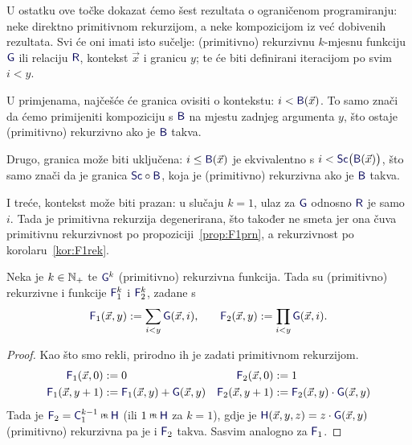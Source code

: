 \begin{napomena}[{name=[izračunljive granice i prazni konteksti]}]\label{nap:igpk}
	U ostatku ove točke dokazat ćemo šest rezultata o ograničenom programiranju: neke direktno primitivnom rekurzijom, a neke kompozicijom iz već dobivenih rezultata. Svi će oni imati isto sučelje: (primitivno) rekurzivnu $k$-mjesnu funkciju $\f G$ ili relaciju $\f R$, kontekst $\vec x$ i granicu $y$; te će biti definirani iteracijom po svim $i<y$.
	
	U primjenama, najčešće će granica ovisiti o kontekstu: $i<\f B(\vec x)$. To samo znači da ćemo primijeniti kompoziciju s $\f B$ na mjestu zadnjeg argumenta $y$, što ostaje (primitivno) rekurzivno ako je $\f B$ takva.

	Drugo, granica može biti uključena: $i\le\f B(\vec x)$ je ekvivalentno s $i<\f{Sc}\bigl(\f B(\vec x)\bigr)$, što samo znači da je granica $\f{Sc}\circ\f B$, koja je (primitivno) rekurzivna ako je $\f B$ takva.

	I treće, kontekst može biti prazan: u slučaju $k=1$, ulaz za $\f G$ odnosno $\f R$ je samo $i$. Tada je primitivna rekurzija degenerirana, što također ne smeta jer ona čuva primitivnu rekurzivnost po propoziciji~\ref{prop:F1prn}, a rekurzivnost po korolaru~\ref{kor:F1rek}.
\end{napomena}

\begin{lema}[{name=[ograničene sume i produkti čuvaju (primitivnu) rekurzivnost]}]\label{lm:sumprodrek}
    Neka je $k\in{\mathbb N}_+$ te $\f G^k$ (primitivno) rekurzivna funkcija. Tada su (primitivno) rekurzivne i funkcije $\f F_1^k$ i $\f F_2^k$, zadane s
\begin{equation}
    \f F_1(\vec x,y):=\sum_{i<y}\f G(\vec x,i)\text,\qquad
    \f F_2(\vec x,y):=\prod_{i<y}\f G(\vec x,i)\text.
\end{equation}
\end{lema}
\begin{proof}
    Kao što smo rekli, prirodno ih je zadati primitivnom rekurzijom.
    \begin{align}
        \label{eq:sumG1}\f F_1(\vec x,0)&:=0&\f F_2(\vec x,0)&:=1
        \\
        \label{eq:sumH1}
        \f F_1(\vec x,y+1)&:=\f F_1(\vec x,y)+\f G(\vec x,y)&
        \f F_2(\vec x,y+1)&:=\f F_2(\vec x,y)\cdot\f G(\vec x,y)
    \end{align}
	Tada je $\f F_2=\f C_1^{k-1}\pr\f H$ (ili $1\pr\f H$ za $k=1$), gdje je $\f H(\vec x,y,z)=z\cdot\f G(\vec x,y)$ (primitivno) rekurzivna pa je i $\f F_2$ takva. Sasvim analogno za $\f F_1$.
\end{proof}


